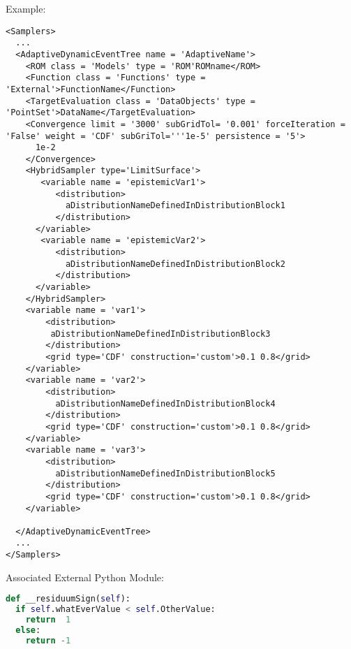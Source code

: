 Example:
\begin{lstlisting}[style=XML]
<Samplers>
  ...
  <AdaptiveDynamicEventTree name = 'AdaptiveName'>
    <ROM class = 'Models' type = 'ROM'ROMname</ROM>
    <Function class = 'Functions' type = 'External'>FunctionName</Function>
    <TargetEvaluation class = 'DataObjects' type = 'PointSet'>DataName</TargetEvaluation>
    <Convergence limit = '3000' subGridTol= '0.001' forceIteration = 'False' weight = 'CDF' subGriTol='''1e-5' persistence = '5'>
      1e-2
    </Convergence>
    <HybridSampler type='LimitSurface'>
       <variable name = 'epistemicVar1'>
          <distribution>
            aDistributionNameDefinedInDistributionBlock1
          </distribution>
      </variable>
       <variable name = 'epistemicVar2'>
          <distribution>
            aDistributionNameDefinedInDistributionBlock2
          </distribution>
      </variable>
    </HybridSampler>
    <variable name = 'var1'>
        <distribution>
         aDistributionNameDefinedInDistributionBlock3
        </distribution>
        <grid type='CDF' construction='custom'>0.1 0.8</grid>
    </variable>
    <variable name = 'var2'>
        <distribution>
          aDistributionNameDefinedInDistributionBlock4
        </distribution>
        <grid type='CDF' construction='custom'>0.1 0.8</grid>
    </variable>
    <variable name = 'var3'>
        <distribution>
          aDistributionNameDefinedInDistributionBlock5
        </distribution>
        <grid type='CDF' construction='custom'>0.1 0.8</grid>
    </variable>

  </AdaptiveDynamicEventTree>
  ...
</Samplers>
\end{lstlisting}

Associated External Python Module:
\begin{lstlisting}[language=python]
def __residuumSign(self):
  if self.whatEverValue < self.OtherValue:
    return  1
  else:
    return -1
\end{lstlisting}


